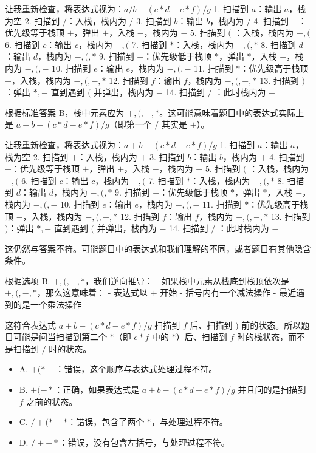 \documentclass[lang=cn,newtx,10pt,scheme=chinese]{../../../elegantbook}
\begin{document}
\begin{enumerate}
    让我重新检查，将表达式视为：$a/b - (c*d-e*f) / g$
    1. 扫描到 $a$：输出 $a$，栈为空
    2. 扫描到 $/$：入栈，栈内为 $/$
    3. 扫描到 $b$：输出 $b$，栈内为 $/$
    4. 扫描到 $-$：优先级等于栈顶 $+$，弹出 $+$，入栈 $-$，栈内为 $-$
    5. 扫描到 $($ ：入栈，栈内为 $-,($
    6. 扫描到 $c$：输出 $c$，栈内为 $-,($
    7. 扫描到 $*$：入栈，栈内为 $-,(,*$
    8. 扫描到 $d$：输出 $d$，栈内为 $-,(,*$
    9. 扫描到 $-$：优先级低于栈顶 $*$，弹出 $*$，入栈 $-$，栈内为 $-,(,-$
    10. 扫描到 $e$：输出 $e$，栈内为 $-,(,-$
    11. 扫描到 $*$：优先级高于栈顶 $-$，入栈，栈内为 $-,(,-,*$
    12. 扫描到 $f$：输出 $f$，栈内为 $-,(,-,*$
    13. 扫描到 $)$：弹出 $*,-$ 直到遇到 $($ 并弹出，栈内为 $-$
    14. 扫描到 $/$ ：此时栈内为 $-$

    根据标准答案 B，栈中元素应为 $+,(,-,*$。这可能意味着题目中的表达式实际上是 $a+b-(c*d-e*f)/g$（即第一个 $/$ 其实是 $+$）。

    让我重新检查，将表达式视为：$a+b - (c*d-e*f) / g$
    1. 扫描到 $a$：输出 $a$，栈为空
    2. 扫描到 $+$：入栈，栈内为 $+$
    3. 扫描到 $b$：输出 $b$，栈内为 $+$
    4. 扫描到 $-$：优先级等于栈顶 $+$，弹出 $+$，入栈 $-$，栈内为 $-$
    5. 扫描到 $($ ：入栈，栈内为 $-,($
    6. 扫描到 $c$：输出 $c$，栈内为 $-,($
    7. 扫描到 $*$：入栈，栈内为 $-,(,*$
    8. 扫描到 $d$：输出 $d$，栈内为 $-,(,*$
    9. 扫描到 $-$：优先级低于栈顶 $*$，弹出 $*$，入栈 $-$，栈内为 $-,(,-$
    10. 扫描到 $e$：输出 $e$，栈内为 $-,(,-$
    11. 扫描到 $*$：优先级高于栈顶 $-$，入栈，栈内为 $-,(,-,*$
    12. 扫描到 $f$：输出 $f$，栈内为 $-,(,-,*$
    13. 扫描到 $)$：弹出 $*,-$ 直到遇到 $($ 并弹出，栈内为 $-$
    14. 扫描到 $/$ ：此时栈内为 $-$

    这仍然与答案不符。可能题目中的表达式和我们理解的不同，或者题目有其他隐含条件。

    根据选项 B. $+,(,-,*$，我们逆向推导：
    - 如果栈中元素从栈底到栈顶依次是 $+,(,-,*$，那么这意味着：
      - 表达式以 $+$ 开始
      - 括号内有一个减法操作
      - 最近遇到的是一个乘法操作
    
    这符合表达式 $a+b-(c*d-e*f)/g$ 扫描到 $f$ 后、扫描到 $)$ 前的状态。所以题目可能是问当扫描到第二个 $*$（即 $e*f$ 中的 $*$）后、扫描到 $f$ 时的栈状态，而不是扫描到 $/$ 时的状态。

    \begin{itemize}
        \item A. $+ ( * -$：错误，这个顺序与表达式处理过程不符。
        \item B. $+ ( - *$：正确，如果表达式是 $a+b-(c*d-e*f)/g$ 并且问的是扫描到 $f$ 之前的状态。
        \item C. $/+(*-*$：错误，包含了两个 $*$，与处理过程不符。
        \item D. $/+-*$：错误，没有包含左括号，与处理过程不符。
    \end{itemize}


\end{enumerate}
\end{document}
